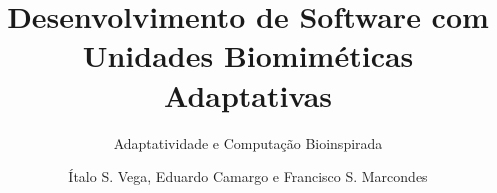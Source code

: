 \author{Ítalo S. Vega, Eduardo Camargo e Francisco S. Marcondes}
\subtitle{Adaptatividade e Computação Bioinspirada}
\title{Desenvolvimento de Software com Unidades Biomiméticas Adaptativas}
\maketitle
\frontmatter
%
%
%
%
\tableofcontents
%
